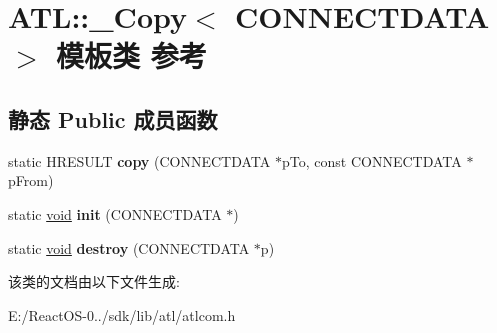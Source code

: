 \hypertarget{class_a_t_l_1_1___copy_3_01_c_o_n_n_e_c_t_d_a_t_a_01_4}{}\section{A\+TL\+:\+:\+\_\+\+Copy$<$ C\+O\+N\+N\+E\+C\+T\+D\+A\+TA $>$ 模板类 参考}
\label{class_a_t_l_1_1___copy_3_01_c_o_n_n_e_c_t_d_a_t_a_01_4}
\subsection*{静态 Public 成员函数}
\begin{DoxyCompactItemize}
\item 
\mbox{\label{class_a_t_l_1_1___copy_3_01_c_o_n_n_e_c_t_d_a_t_a_01_4_a1656d775a034d64ef665d595342f0b40}} 
static H\+R\+E\+S\+U\+LT {\bfseries copy} (C\+O\+N\+N\+E\+C\+T\+D\+A\+TA $\ast$p\+To, const C\+O\+N\+N\+E\+C\+T\+D\+A\+TA $\ast$p\+From)
\item 
\mbox{\label{class_a_t_l_1_1___copy_3_01_c_o_n_n_e_c_t_d_a_t_a_01_4_af1bd2d75431ee98236ef9cb0f37aa060}} 
static \hyperlink{interfacevoid}{void} {\bfseries init} (C\+O\+N\+N\+E\+C\+T\+D\+A\+TA $\ast$)
\item 
\mbox{\label{class_a_t_l_1_1___copy_3_01_c_o_n_n_e_c_t_d_a_t_a_01_4_a3edf2860ccc29a39c3f7f8e29d14f6c8}} 
static \hyperlink{interfacevoid}{void} {\bfseries destroy} (C\+O\+N\+N\+E\+C\+T\+D\+A\+TA $\ast$p)
\end{DoxyCompactItemize}


该类的文档由以下文件生成\+:\begin{DoxyCompactItemize}
\item 
E\+:/\+React\+O\+S-\/0../sdk/lib/atl/atlcom.\+h\end{DoxyCompactItemize}
